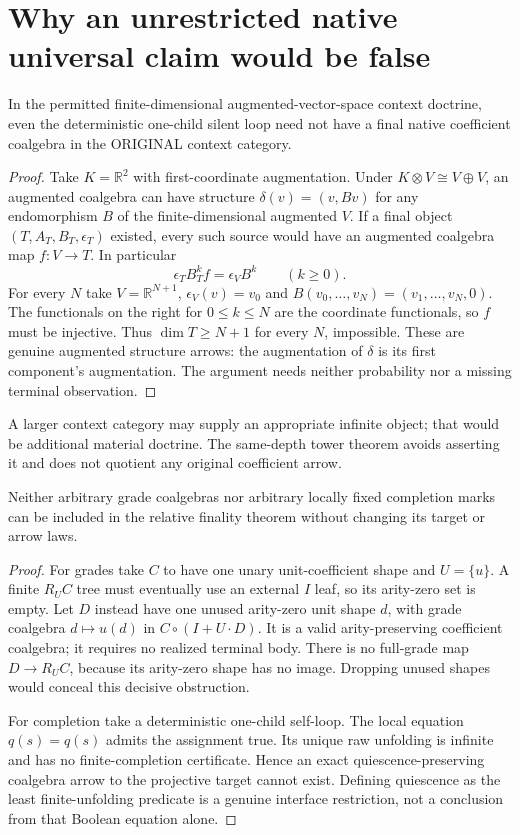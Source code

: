 \documentclass[11pt]{article}
\begin{document}
\section{Why an unrestricted native universal claim would be false}
\begin{proposition}
In the permitted finite-dimensional augmented-vector-space context doctrine, even the deterministic one-child silent loop need not have a final native coefficient coalgebra in the ORIGINAL context category.
\end{proposition}
\begin{proof}
Take $K=\mathbb R^2$ with first-coordinate augmentation. Under $K\otimes V\cong V\oplus V$, an augmented coalgebra can have structure $\delta(v)=(v,Bv)$ for any endomorphism $B$ of the finite-dimensional augmented $V$. If a final object $(T,A_T,B_T,\epsilon_T)$ existed, every such source would have an augmented coalgebra map $f:V\to T$. In particular
\[
 \epsilon_T B_T^k f=\epsilon_V B^k\qquad(k\ge0).
\]
For every $N$ take $V=\mathbb R^{N+1}$, $\epsilon_V(v)=v_0$ and $B(v_0,\ldots,v_N)=(v_1,\ldots,v_N,0)$. The functionals on the right for $0\le k\le N$ are the coordinate functionals, so $f$ must be injective. Thus $\dim T\ge N+1$ for every $N$, impossible. These are genuine augmented structure arrows: the augmentation of $\delta$ is its first component's augmentation. The argument needs neither probability nor a missing terminal observation.
\end{proof}
A larger context category may supply an appropriate infinite object; that would be additional material doctrine. The same-depth tower theorem avoids asserting it and does not quotient any original coefficient arrow.

\begin{proposition}
Neither arbitrary grade coalgebras nor arbitrary locally fixed completion marks can be included in the relative finality theorem without changing its target or arrow laws.
\end{proposition}
\begin{proof}
For grades take $C$ to have one unary unit-coefficient shape and $U=\{u\}$. A finite $R_UC$ tree must eventually use an external $I$ leaf, so its arity-zero set is empty. Let $D$ instead have one unused arity-zero unit shape $d$, with grade coalgebra $d\mapsto u(d)$ in $C\circ(I+U\cdot D)$. It is a valid arity-preserving coefficient coalgebra; it requires no realized terminal body. There is no full-grade map $D\to R_UC$, because its arity-zero shape has no image. Dropping unused shapes would conceal this decisive obstruction.

For completion take a deterministic one-child self-loop. The local equation $q(s)=q(s)$ admits the assignment true. Its unique raw unfolding is infinite and has no finite-completion certificate. Hence an exact quiescence-preserving coalgebra arrow to the projective target cannot exist. Defining quiescence as the least finite-unfolding predicate is a genuine interface restriction, not a conclusion from that Boolean equation alone.
\end{proof}
\end{document}
